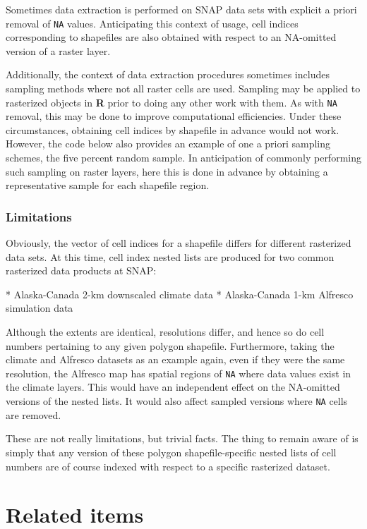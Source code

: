 \documentclass{article}\usepackage[]{graphicx}\usepackage[]{color}
\begin{document}
Sometimes data extraction is performed on SNAP data sets with explicit a priori removal of \texttt{NA} values.
Anticipating this context of usage, cell indices corresponding to shapefiles are also obtained with respect to an NA-omitted version of a raster layer.

Additionally, the context of data extraction procedures sometimes includes sampling methods where not all raster cells are used.
Sampling may be applied to rasterized objects in \textbf{R} prior to doing any other work with them.
As with \texttt{NA} removal, this may be done to improve computational efficiencies.
Under these circumstances, obtaining cell indices by shapefile in advance would not work.
However, the code below also provides an example of one a priori sampling schemes, the five percent random sample.
In anticipation of commonly performing such sampling on raster layers,
here this is done in advance by obtaining a representative sample for each shapefile region.

\subsubsection{Limitations}
Obviously, the vector of cell indices for a shapefile differs for different rasterized data sets.
At this time, cell index nested lists are produced for two common rasterized data products at SNAP:

* Alaska-Canada 2-km downscaled climate data
* Alaska-Canada 1-km Alfresco simulation data

Although the extents are identical, resolutions differ, and hence so do cell numbers pertaining to any given polygon shapefile.
Furthermore, taking the climate and Alfresco datasets as an example again, even if they were the same resolution,
the Alfresco map has spatial regions of \texttt{NA} where data values exist in the climate layers.
This would have an independent effect on the NA-omitted versions of the nested lists.
It would also affect sampled versions where \texttt{NA} cells are removed.

These are not really limitations, but trivial facts.
The thing to remain aware of is simply that any version of these polygon shapefile-specific nested lists of cell numbers are of course indexed with respect to a specific rasterized dataset.

\section{Related items}
\end{document}
